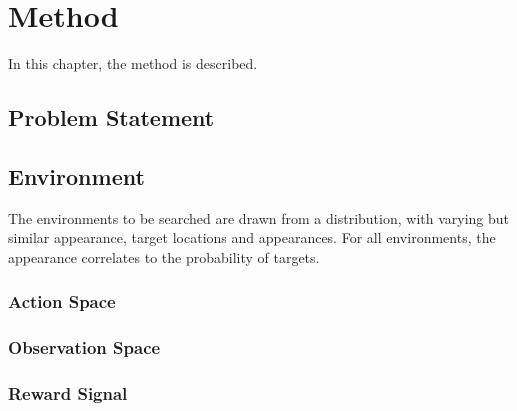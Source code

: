 \chapter{Method}
\label{cha:method}

In this chapter, the method is described.

\section{Problem Statement}



\section{Environment}

The environments to be searched are drawn from a distribution, with varying but similar appearance, target locations and appearances. For all environments, the appearance correlates to the probability of targets.

\subsection{Action Space}

\subsection{Observation Space}

\subsection{Reward Signal}


